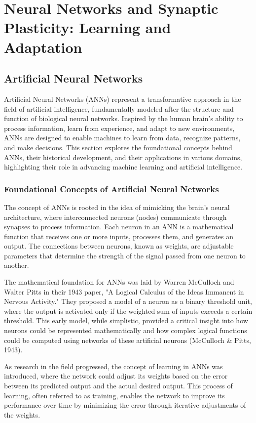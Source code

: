 \documentclass[12pt,twoside]{article}
\begin{document}
\section{Neural Networks and Synaptic Plasticity: Learning and Adaptation}

\subsection{Artificial Neural Networks}

Artificial Neural Networks (ANNs) represent a transformative approach in the field of artificial intelligence, fundamentally modeled after the structure and function of biological neural networks. Inspired by the human brain's ability to process information, learn from experience, and adapt to new environments, ANNs are designed to enable machines to learn from data, recognize patterns, and make decisions. This section explores the foundational concepts behind ANNs, their historical development, and their applications in various domains, highlighting their role in advancing machine learning and artificial intelligence.

\subsubsection{Foundational Concepts of Artificial Neural Networks}

The concept of ANNs is rooted in the idea of mimicking the brain's neural architecture, where interconnected neurons (nodes) communicate through synapses to process information. Each neuron in an ANN is a mathematical function that receives one or more inputs, processes them, and generates an output. The connections between neurons, known as weights, are adjustable parameters that determine the strength of the signal passed from one neuron to another.

The mathematical foundation for ANNs was laid by Warren McCulloch and Walter Pitts in their 1943 paper, "A Logical Calculus of the Ideas Immanent in Nervous Activity." They proposed a model of a neuron as a binary threshold unit, where the output is activated only if the weighted sum of inputs exceeds a certain threshold. This early model, while simplistic, provided a critical insight into how neurons could be represented mathematically and how complex logical functions could be computed using networks of these artificial neurons (McCulloch & Pitts, 1943).

As research in the field progressed, the concept of learning in ANNs was introduced, where the network could adjust its weights based on the error between its predicted output and the actual desired output. This process of learning, often referred to as training, enables the network to improve its performance over time by minimizing the error through iterative adjustments of the weights.
\end{document}
